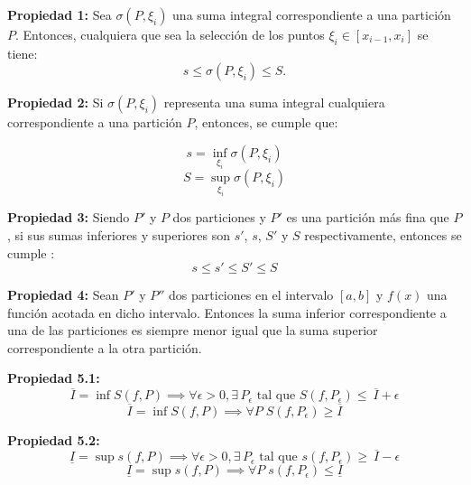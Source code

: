 \documentclass[10pt]{article}
\begin{document}
\item \textbf{Propiedad 1:} 
Sea $\sigma(P, \xi_i)$ una suma integral correspondiente a una partición $P$. Entonces, cualquiera que sea la selección de los puntos $\xi_i \in [x_{i-1}, x_i]$ se tiene:
\begin{equation}
    s \leq \sigma(P, \xi_i) \leq S.
\end{equation}

\item \textbf{Propiedad 2:} 
Si $\sigma(P, \xi_i)$ representa una suma integral cualquiera correspondiente a una partición $P$, entonces, se cumple que:

\[
s = \inf_{\xi_i} \sigma(P, \xi_i)   
\]
\[ S = \sup_{\xi_i} \sigma(P, \xi_i) \]


\item \textbf{Propiedad 3:} Siendo $P'$ y  $P $ dos particiones y $P'$ es una partición más fina que $P$, si sus sumas inferiores y superiores son $s'$, $s$, $S'$ y $S$ respectivamente, entonces se cumple :
\begin{equation}
    s \leq s' \leq S' \leq S
\end{equation}

\item \textbf{Propiedad 4:} Sean $P'$ y $P''$  dos particiones en el intervalo $[a,b]$  y $f(x)$ una función acotada en dicho intervalo. Entonces la suma inferior correspondiente a una de las particiones es siempre menor igual que la suma superior correspondiente a la otra partición. 


\item \textbf{Propiedad 5.1:} 
\begin{equation}
   \overline{I} = \inf  S(f, P)\implies \forall \epsilon > 0, \exists \, P_\epsilon \text{ tal que } S(f, P_\epsilon)\leq \  \overline{I} + \epsilon

\end{equation}
\begin{equation}
   \overline{I} = \inf  S(f, P)\implies \forall P \; S(f, P_\epsilon) \geq    \overline{I}

\end{equation}
\item \textbf{Propiedad 5.2:} 
\begin{equation}
   \underline{I} = \sup  s(f, P)\implies \forall \epsilon > 0, \exists \, P_\epsilon \text{ tal que } s(f, P_\epsilon)\geq \  \overline{I} -\epsilon

\end{equation}
\begin{equation}
   \underline{I} = \sup  s(f, P)\implies \forall P \; s(f, P_\epsilon) \leq    \underline{I}

\end{equation}
\end{document}
